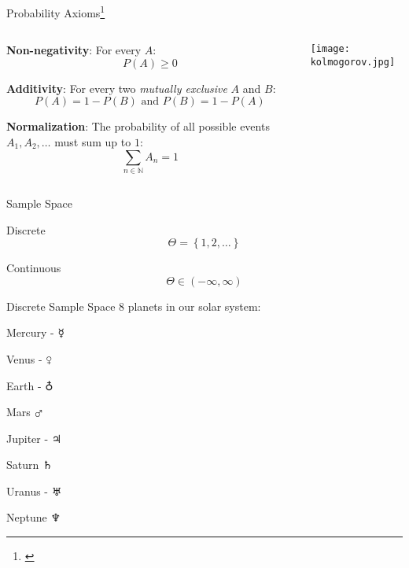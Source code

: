 \begin{frame}{Probability Axioms\footnote{\textcite{kolmogorovFoundationsTheoryProbability1933}}}
	\begin{columns}
		\begin{column}{0.8\textwidth}
			\begin{vfilleditems}
				\item \textbf{Non-negativity}: For every $A$:
				$$P(A) \geq 0$$
				\item \textbf{Additivity}: For every two \textit{mutually exclusive}
				$A$ and $B$:
				$$P(A) = 1 - P(B) \text{ and } P(B) = 1 - P(A)$$
				\item \textbf{Normalization}: The probability of all possible
				events $A_1, A_2, \dots$ must sum up to $1$:
				$$\sum_{n \in \mathbb{N}} A_n = 1$$
			\end{vfilleditems}
		\end{column}
		\begin{column}{0.2\textwidth}
			\centering
			\texttt{[image: kolmogorov.jpg]}
		\end{column}
	\end{columns}
\end{frame}

\begin{frame}{Sample Space}
	\begin{vfilleditems}
		\item Discrete $$\Theta = \left\{1, 2, \ldots \right\}$$
		\item Continuous $$\Theta \in \left(-\infty, \infty \right)$$
	\end{vfilleditems}
\end{frame}

\begin{frame}{Discrete Sample Space}
	8 planets in our solar system:
	\begin{vfilleditems}
		\item Mercury - $\mercury$
		\item Venus - $\venus$
		\item Earth - $\earth$
		\item Mars $\mars$
		\item Jupiter - $\jupiter$
		\item Saturn $\saturn$
		\item Uranus - $\uranus$
		\item Neptune $\neptune$
	\end{vfilleditems}
\end{frame}

